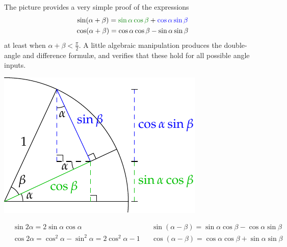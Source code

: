 \begin{minipage}[t]{0.63\linewidth}\vspace{-10pt}
	\label{sec:multangle}
	
	The picture provides a very simple proof of the expressions
	\begin{gather*}
		\sin(\alpha+\beta)=\textcolor{Green}{\sin\alpha\cos\beta}+\textcolor{blue}{\cos\alpha\sin\beta}\\
		\cos(\alpha+\beta)=\cos\alpha\cos\beta-\sin\alpha\sin\beta
	\end{gather*}
	at least when $\alpha+\beta<\frac\pi 2$. A little algebraic manipulation produces the double-angle and difference formulæ, and verifies that these hold for all possible angle inputs.
\end{minipage}
\hfill
\begin{minipage}[t]{0.36\linewidth}\vspace{0pt}
	\flushright\includegraphics[scale=0.9]{angles-multipleangle}
\end{minipage}\par
\begin{align*}
	&\sin 2\alpha=2\sin\alpha\cos\alpha &&\sin(\alpha-\beta)=\sin\alpha\cos\beta-\cos\alpha\sin\beta\\
	&\cos 2\alpha=\cos^2\alpha-\sin^2\alpha=2\cos^2\alpha-1&&\cos(\alpha-\beta)=\cos\alpha\cos\beta+\sin\alpha\sin\beta
\end{align*}

\smallskip

